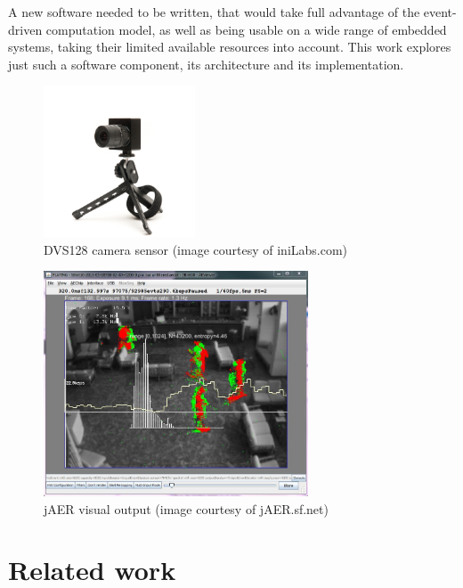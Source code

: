 \documentclass[a4paper,12pt]{report}
\begin{document}
A new software needed to be written, that would take full advantage of the event-driven computation model, as well as being usable on a wide range of embedded systems, taking their limited available resources into account.
This work explores just such a software component, its architecture and its implementation.

\begin{figure}[H]
\begin{center}
\includegraphics[width=0.4\textwidth]{dvs128}
\caption{DVS128 camera sensor (image courtesy of iniLabs.com)}
\label{fig:dvs128}
\end{center}
\end{figure}

\begin{figure}[H]
\begin{center}
\includegraphics[width=0.7\textwidth]{jaer}
\caption{jAER visual output (image courtesy of jAER.sf.net)}
\label{fig:jaer}
\end{center}
\end{figure}

\chapter{Related work} \label{chap:related_work}
\end{document}
